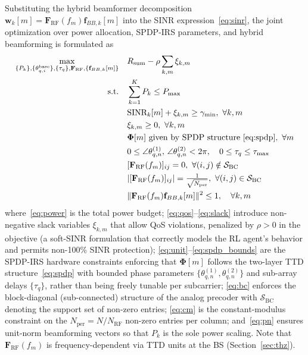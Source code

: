 \documentclass[journal,twocolumn]{IEEEtran}
\newcommand{\vect}[1]{\mathbf{#1}}
\newcommand{\mat}[1]{\mathbf{#1}}
\begin{document}
Substituting the hybrid beamformer decomposition $\vect{w}_k[m] = \mat{F}_{\text{RF}}(f_m)\vect{f}_{BB,k}[m]$ into the SINR expression~\eqref{eq:sinr}, the joint optimization over power allocation, SPDP-IRS parameters, and hybrid beamforming is formulated as
\begin{subequations}
\begin{align}
\max_{\{P_k\},\{\theta_{q,i}^{\text{base}}\},\{\tau_q\},\mat{F}_{\text{RF}},\{\vect{f}_{BB,k}[m]\}} \quad & R_{\text{sum}} - \rho\sum_{k,m}\xi_{k,m} \label{eq:obj}\\
\text{s.t.} \quad & \sum_{k=1}^{K} P_k \leq P_{\max} \label{eq:power}\\
& \text{SINR}_k[m] + \xi_{k,m} \geq \gamma_{\min},\ \forall k, m \label{eq:qos}\\
& \xi_{k,m} \geq 0,\ \forall k, m \label{eq:slack}\\
& \bm{\Phi}[m] \text{ given by SPDP structure~\eqref{eq:spdp}},\ \forall m \label{eq:unit}\\
& 0 \leq \angle\theta_{q,n}^{(1)},\,\angle\theta_{q,n}^{(2)} < 2\pi,\quad 0 \leq \tau_q \leq \tau_{\max} \label{eq:spdp_bounds}\\
& [\mat{F}_{\text{RF}}(f_m)]_{ij} = 0,\ \forall (i,j) \notin \mathcal{S}_{\text{BC}} \label{eq:bc}\\
& |[\mat{F}_{\text{RF}}(f_m)]_{ij}| = \tfrac{1}{\sqrt{N_{\text{per}}}},\ \forall (i,j) \in \mathcal{S}_{\text{BC}} \label{eq:cm}\\
& \|\mat{F}_{\text{RF}}(f_m)\vect{f}_{BB,k}[m]\|^2 \leq 1,\quad \forall k, m \label{eq:pn}
\end{align}
\end{subequations}
where~\eqref{eq:power} is the total power budget; \eqref{eq:qos}--\eqref{eq:slack} introduce non-negative slack variables $\xi_{k,m}$ that allow QoS violations, penalized by $\rho>0$ in the objective (a soft-SINR formulation that correctly models the RL agent's behavior and permits non-100\% SINR protection); \eqref{eq:unit}--\eqref{eq:spdp_bounds} are the SPDP-IRS hardware constraints enforcing that $\bm{\Phi}[m]$ follows the two-layer TTD structure~\eqref{eq:spdp} with bounded phase parameters $\{\theta_{q,n}^{(1)}, \theta_{q,n}^{(2)}\}$ and sub-array delays $\{\tau_q\}$, rather than being freely tunable per subcarrier; \eqref{eq:bc} enforces the block-diagonal (sub-connected) structure of the analog precoder with $\mathcal{S}_{\text{BC}}$ denoting the support set of non-zero entries; \eqref{eq:cm} is the constant-modulus constraint on the $N_{\text{per}} = N/N_{\text{RF}}$ non-zero entries per column; and~\eqref{eq:pn} ensures unit-norm beamforming vectors so that $P_k$ is the sole power scaling. Note that $\mat{F}_{\text{RF}}(f_m)$ is frequency-dependent via TTD units at the BS (Section~\ref{sec:thz}).
\end{document}
